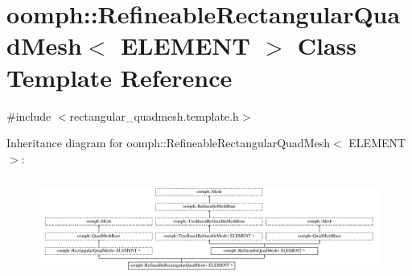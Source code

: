 \hypertarget{classoomph_1_1RefineableRectangularQuadMesh}{}\section{oomph\+:\+:Refineable\+Rectangular\+Quad\+Mesh$<$ E\+L\+E\+M\+E\+NT $>$ Class Template Reference}
\label{classoomph_1_1RefineableRectangularQuadMesh}


{\ttfamily \#include $<$rectangular\+\_\+quadmesh.\+template.\+h$>$}

Inheritance diagram for oomph\+:\+:Refineable\+Rectangular\+Quad\+Mesh$<$ E\+L\+E\+M\+E\+NT $>$\+:\begin{figure}[H]
\begin{center}
\leavevmode
\includegraphics[height=3.343283cm]{classoomph_1_1RefineableRectangularQuadMesh}
\end{center}
\end{figure}
